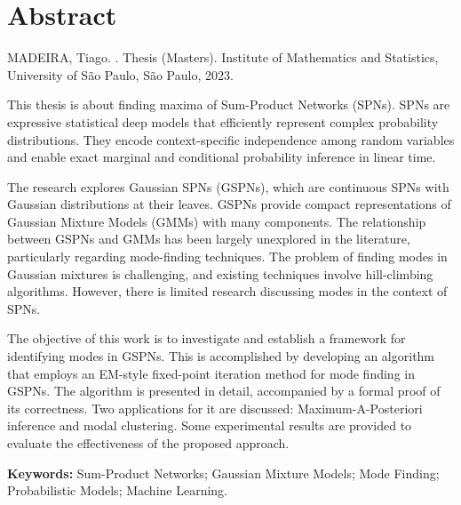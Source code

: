 \chapter*{Abstract}

MADEIRA, Tiago. \textbf{\@title}. Thesis (Masters). Institute of Mathematics and Statistics, University of São Paulo, São Paulo, 2023.

\vspace{1em}

This thesis is about finding maxima of Sum-Product Networks (SPNs). SPNs are expressive statistical deep models that efficiently represent complex probability distributions. They encode context-specific independence among random variables and enable exact marginal and conditional probability inference in linear time.

The research explores Gaussian SPNs (GSPNs), which are continuous SPNs with Gaussian distributions at their leaves. GSPNs provide compact representations of Gaussian Mixture Models (GMMs) with many components. The relationship between GSPNs and GMMs has been largely unexplored in the literature, particularly regarding mode-finding techniques. The problem of finding modes in Gaussian mixtures is challenging, and existing techniques involve hill-climbing algorithms. However, there is limited research discussing modes in the context of SPNs.

The objective of this work is to investigate and establish a framework for identifying modes in GSPNs. This is accomplished by developing an algorithm that employs an EM-style fixed-point iteration method for mode finding in GSPNs. The algorithm is presented in detail, accompanied by a formal proof of its correctness. Two applications for it are discussed: Maximum-A-Posteriori inference and modal clustering. Some experimental results are provided to evaluate the effectiveness of the proposed approach.

\vspace{1em}

\noindent \textbf{Keywords:} Sum-Product Networks; Gaussian Mixture Models; Mode Finding; Probabilistic Models; Machine Learning.
